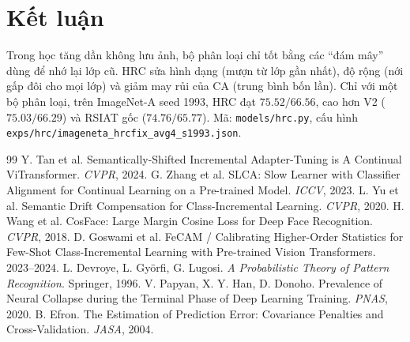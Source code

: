 \documentclass[11pt]{article}
\begin{document}
\section{Kết luận}
Trong học tăng dần không lưu ảnh, bộ phân loại chỉ tốt bằng các ``đám mây'' dùng để nhớ lại lớp cũ. HRC sửa hình dạng
(mượn từ lớp gần nhất), độ rộng (nới gấp đôi cho mọi lớp) và giảm may rủi của CA (trung bình bốn lần). Chỉ với một bộ
phân loại, trên ImageNet-A seed 1993, HRC đạt $75.52/66.56$, cao hơn V2 ($75.03/66.29$) và RSIAT gốc
($74.76/65.77$). Mã: \texttt{models/hrc.py}, cấu hình \texttt{exps/hrc/imageneta\_hrcfix\_avg4\_s1993.json}.

\begin{thebibliography}{99}
 Y. Tan et al. Semantically-Shifted Incremental Adapter-Tuning is A Continual ViTransformer. \emph{CVPR}, 2024.
 G. Zhang et al. SLCA: Slow Learner with Classifier Alignment for Continual Learning on a Pre-trained Model. \emph{ICCV}, 2023.
 L. Yu et al. Semantic Drift Compensation for Class-Incremental Learning. \emph{CVPR}, 2020.
 H. Wang et al. CosFace: Large Margin Cosine Loss for Deep Face Recognition. \emph{CVPR}, 2018.
 D. Goswami et al. FeCAM / Calibrating Higher-Order Statistics for Few-Shot Class-Incremental Learning with Pre-trained Vision Transformers. 2023--2024.
 L. Devroye, L. Györfi, G. Lugosi. \emph{A Probabilistic Theory of Pattern Recognition}. Springer, 1996.
 V. Papyan, X. Y. Han, D. Donoho. Prevalence of Neural Collapse during the Terminal Phase of Deep Learning Training. \emph{PNAS}, 2020.
 B. Efron. The Estimation of Prediction Error: Covariance Penalties and Cross-Validation. \emph{JASA}, 2004.
\end{thebibliography}
\end{document}
